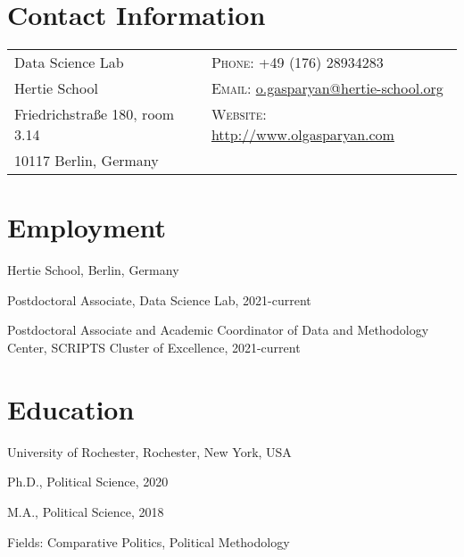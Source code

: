 \documentclass[margin,line,11pt]{res}
\newenvironment{list1}{
  \begin{list}{\ding{113}}{%
      \setlength{\itemsep}{0in}
      \setlength{\parsep}{0in} \setlength{\parskip}{0in}
      \setlength{\topsep}{0in} \setlength{\partopsep}{0in}
      \setlength{\leftmargin}{0.17in}}}{\end{list}}
\begin{document}

\begin{resume}
\section{\sc Contact Information}
\vspace{.05in}
\begin{tabular}{@{}p{2.5in}p{4in}}
Data Science Lab                 & \textsc{Phone}: +49 (176) 28934283 \\
  Hertie School  & \textsc{Email}: \href{mailto:o.gasparyan@hertie-school.org}{o.gasparyan@hertie-school.org} \\
Friedrichstraße 180, room 3.14              & \textsc{Website}: \href{http://www.olgasparyan.com}{http://www.olgasparyan.com} \\
10117 Berlin, Germany        \\
\end{tabular}

\section{\sc Employment}
{Hertie School}, Berlin, Germany\\
\vspace*{-.1in}
\begin{list1}
	\item[] Postdoctoral Associate, Data Science Lab, 2021-current
	\item[] Postdoctoral Associate and Academic Coordinator of Data and Methodology Center, SCRIPTS Cluster of Excellence, 2021-current

\end{list1}

\section{\sc Education}
{University of Rochester}, Rochester, New York, USA\\
\vspace*{-.1in}
\begin{list1}
\item[] Ph.D., Political Science, 2020 
\item[] M.A., Political Science, 2018 
\item[] Fields: Comparative Politics, Political Methodology 
\end{list1}


\end{resume}
\end{document}
